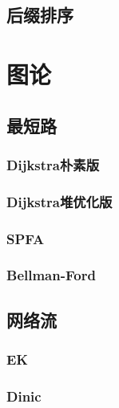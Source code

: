 \documentclass[10pt,a4paper]{article}
\begin{document}
\subsection{后缀排序}
\begin{spacing}{1.5}

\end{spacing}

\section{图论}
\subsection{最短路}
\subsubsection{Dijkstra朴素版}
\begin{spacing}{1.5}

\end{spacing}

\subsubsection{Dijkstra堆优化版}
\begin{spacing}{1.5}

\end{spacing}

\subsubsection{SPFA}
\begin{spacing}{1.5}

\end{spacing}

\subsubsection{Bellman-Ford}

\subsection{网络流}
\subsubsection{EK}

\subsubsection{Dinic}

\end{document}
